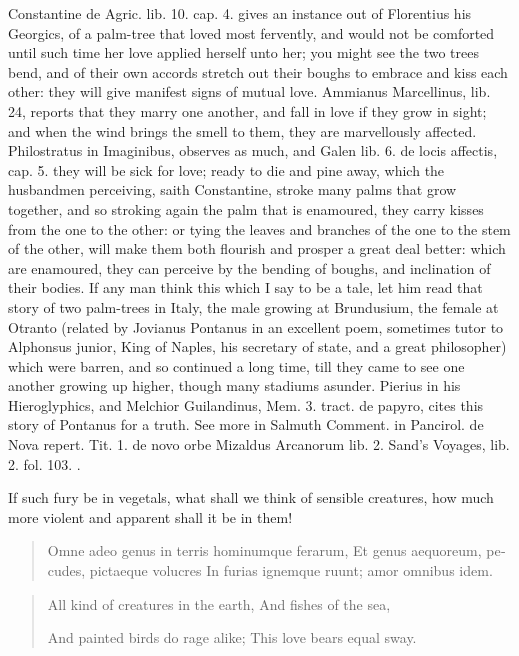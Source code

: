 Constantine de Agric. lib. 10. cap. 4. gives an instance out of
Florentius his Georgics, of a palm-tree that loved most fervently,
 and would not be comforted until such time her love applied
herself unto her; you might see the two trees bend, and of their own
accords stretch out their boughs to embrace and kiss each other: they
will give manifest signs of mutual love. Ammianus Marcellinus, lib. 24,
reports that they marry one another, and fall in love if they grow in
sight; and when the wind brings the smell to them, they are
marvellously affected. Philostratus in Imaginibus, observes as much,
and Galen lib. 6. de locis affectis, cap. 5. they will be sick for
love; ready to die and pine away, which the husbandmen perceiving,
saith Constantine, stroke many palms that grow together, and so
stroking again the palm that is enamoured, they carry kisses from the
one to the other: or tying the leaves and branches of the one to the
stem of the other, will make them both flourish and prosper a great
deal better: which are enamoured, they can perceive by the
bending of boughs, and inclination of their bodies. If any man think
this which I say to be a tale, let him read that story of two
palm-trees in Italy, the male growing at Brundusium, the female at
Otranto (related by Jovianus Pontanus in an excellent poem, sometimes
tutor to Alphonsus junior, King of Naples, his secretary of state, and
a great philosopher) which were barren, and so continued a long time,
till they came to see one another growing up higher, though many
stadiums asunder. Pierius in his Hieroglyphics, and Melchior
Guilandinus, Mem. 3. tract. de papyro, cites this story of Pontanus for
a truth. See more in Salmuth Comment. in Pancirol. de Nova repert. Tit.
1. de novo orbe Mizaldus Arcanorum lib. 2. Sand's Voyages, lib. 2. fol.
103. \etc{}.

If such fury be in vegetals, what shall we think of sensible creatures,
how much more violent and apparent shall it be in them!

\begin{latin}
\begin{verse}%
Omne adeo genus in terris hominumque ferarum,
Et genus aequoreum, pecudes, pictaeque volucres
In furias ignemque ruunt; amor omnibus idem.
\end{verse}%
\end{latin}
\translationrule%
\begin{verse}%
All kind of creatures in the earth,
And fishes of the sea,

And painted birds do rage alike;
This love bears equal sway.
\end{verse}%

